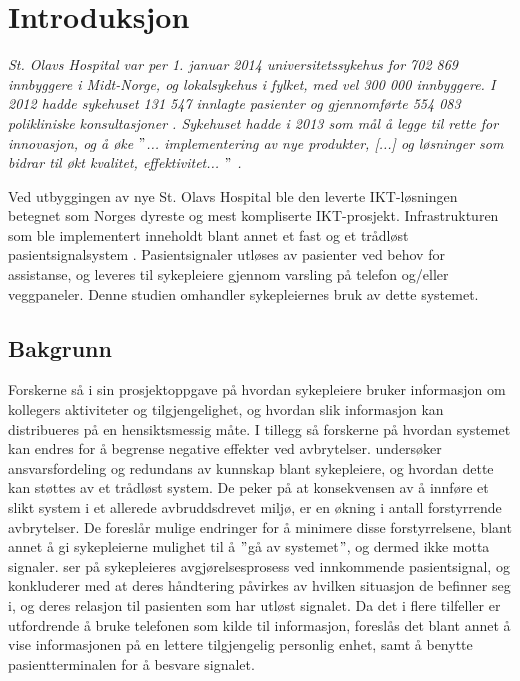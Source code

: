 \chapter{Introduksjon}
\label{chp:introduksjon}

\textit{St. Olavs Hospital var per 1. januar 2014 universitetssykehus for 702 869 innbyggere i Midt-Norge, og lokalsykehus i fylket, med vel 300 000 innbyggere. I 2012 hadde sykehuset 131 547 innlagte pasienter og gjennomførte 554 083 polikliniske konsultasjoner \citep{stolavs}. Sykehuset hadde i 2013 som mål å legge til rette for innovasjon, og å øke $"$... implementering av nye produkter, [...] og løsninger som bidrar til økt kvalitet, effektivitet... $"$ \citep{styring13}.}

\noindent
Ved utbyggingen av nye St. Olavs Hospital ble den leverte IKT-løsningen betegnet som Norges dyreste og mest kompliserte IKT-prosjekt. Infrastrukturen som ble implementert inneholdt blant annet et fast og et trådløst pasientsignalsystem \citep{TU}. Pasientsignaler utløses av pasienter ved behov for assistanse, og leveres til sykepleiere gjennom varsling på telefon og/eller veggpaneler. Denne studien omhandler sykepleiernes bruk av dette systemet.  

\section{Bakgrunn}
Forskerne så i sin prosjektoppgave \citep{Sund13} på hvordan sykepleiere bruker informasjon om kollegers aktiviteter og tilgjengelighet, og hvordan slik informasjon kan distribueres på en hensiktsmessig måte. I tillegg så forskerne på hvordan systemet kan endres for å begrense negative effekter ved avbrytelser. \citet{KlemetsRedundancy} undersøker ansvarsfordeling og redundans av kunnskap blant sykepleiere, og hvordan dette kan støttes av et trådløst system. De peker på at konsekvensen av å innføre et slikt system i et allerede avbruddsdrevet miljø, er en økning i antall forstyrrende avbrytelser. De foreslår mulige endringer for å minimere disse forstyrrelsene, blant annet å gi sykepleierne mulighet til å $"$gå av systemet$"$, og dermed ikke motta signaler. \citet{klemets13} ser på sykepleieres avgjørelsesprosess ved innkommende pasientsignal, og konkluderer med at deres håndtering påvirkes av hvilken situasjon de befinner seg i, og deres relasjon til pasienten som har utløst signalet. Da det i flere tilfeller er utfordrende å bruke telefonen som kilde til informasjon, foreslås det blant annet å vise informasjonen på en lettere tilgjengelig personlig enhet, samt å benytte pasientterminalen for å besvare signalet.

